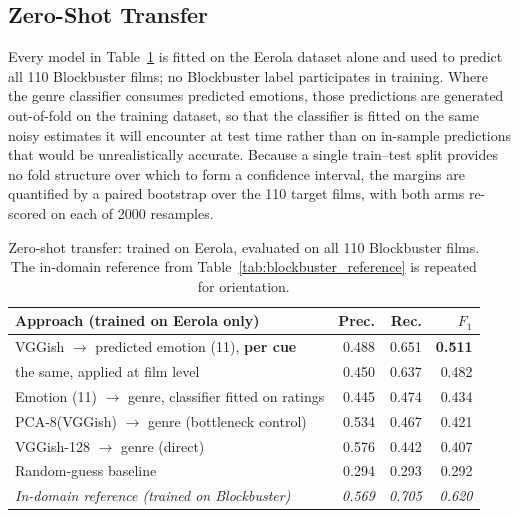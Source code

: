 \subsection{Zero-Shot Transfer}

Every model in Table~\ref{tab:zero_shot} is fitted on the Eerola dataset alone and used to
predict all 110 Blockbuster films; no Blockbuster label participates in training. Where
the genre classifier consumes predicted emotions, those predictions are generated
out-of-fold on the training dataset, so that the classifier is fitted on the same noisy
estimates it will encounter at test time rather than on in-sample predictions that would
be unrealistically accurate. Because a single train--test split provides no fold structure
over which to form a confidence interval, the margins are quantified by a paired bootstrap
over the 110 target films, with both arms re-scored on each of 2000 resamples.

\begin{table}[t]
  \centering
  \caption{Zero-shot transfer: trained on Eerola, evaluated on all 110 Blockbuster films.
    The in-domain reference from Table~\ref{tab:blockbuster_reference} is repeated for
    orientation.}
  \label{tab:zero_shot}
  \begin{tabular}{lrrr}
    \hline
    Approach (trained on Eerola only) & Prec. & Rec. & $F_1$ \\
    \hline
    VGGish $\rightarrow$ predicted emotion (11), \textbf{per cue} & 0.488 & 0.651 & \textbf{0.511} \\
    \quad the same, applied at film level                           & 0.450 & 0.637 & 0.482 \\
    Emotion (11) $\rightarrow$ genre, classifier fitted on ratings  & 0.445 & 0.474 & 0.434 \\
    PCA-8(VGGish) $\rightarrow$ genre (bottleneck control)          & 0.534 & 0.467 & 0.421 \\
    VGGish-128 $\rightarrow$ genre (direct)                         & 0.576 & 0.442 & 0.407 \\
    Random-guess baseline                                           & 0.294 & 0.293 & 0.292 \\
    \hline
    \emph{In-domain reference (trained on Blockbuster)}             & \emph{0.569} & \emph{0.705} & \emph{0.620} \\
    \hline
  \end{tabular}
\end{table}

